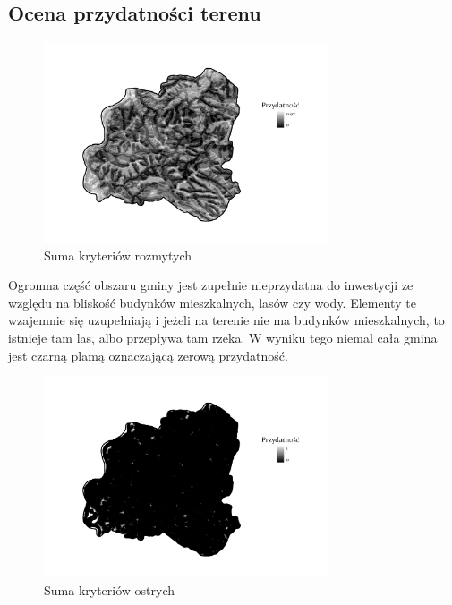 \documentclass{article}
\begin{document}
\subsection{Ocena przydatności terenu}
\begin{figure}[H]
    \centering
    \includegraphics[width=0.75\textwidth]{img/plesna-rozmyte-layout.jpg}
    \caption{Suma kryteriów rozmytych}
\end{figure}

Ogromna część obszaru gminy jest zupełnie nieprzydatna do inwestycji ze względu na bliskość budynków mieszkalnych, lasów czy wody. Elementy te wzajemnie się uzupełniają i jeżeli na terenie nie ma budynków mieszkalnych, to istnieje tam las, albo przepływa tam rzeka. W wyniku tego niemal cała gmina jest czarną plamą oznaczającą zerową przydatność.

\begin{figure}[H]
    \centering
    \includegraphics[width=0.75\textwidth]{img/plesna-ostre-layout.jpg}
    \caption{Suma kryteriów ostrych}
\end{figure}
\end{document}
